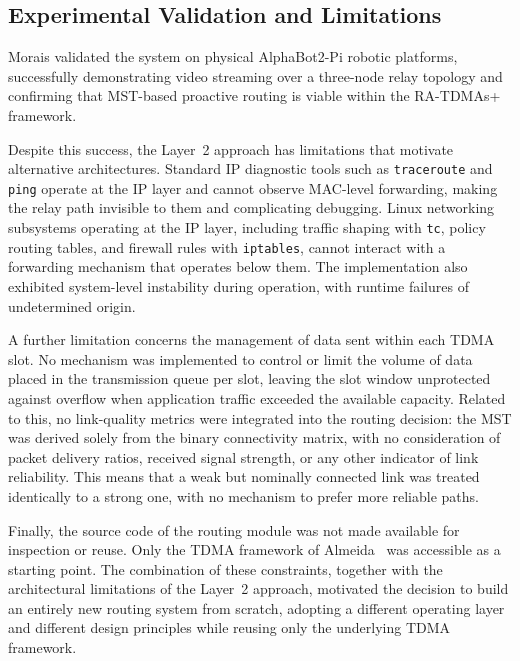 \FloatBarrier
\subsection{Experimental Validation and Limitations}

Morais validated the system on physical AlphaBot2-Pi robotic platforms, successfully
demonstrating video streaming over a three-node relay topology and confirming that MST-based
proactive routing is viable within the RA-TDMAs+ framework.

Despite this success, the Layer~2 approach has limitations that motivate alternative
architectures. Standard IP diagnostic tools such as \texttt{traceroute} and \texttt{ping} operate
at the IP layer and cannot observe MAC-level forwarding, making the relay path invisible to
them and complicating debugging. Linux networking subsystems operating at the IP layer,
including traffic shaping with \texttt{tc}, policy routing tables, and firewall rules with
\texttt{iptables}, cannot interact with a forwarding mechanism that operates below them.
The implementation also exhibited system-level instability during operation, with runtime
failures of undetermined origin.

A further limitation concerns the management of data sent within each TDMA slot. No
mechanism was implemented to control or limit the volume of data placed in the transmission
queue per slot, leaving the slot window unprotected against overflow when application traffic
exceeded the available capacity. Related to this, no link-quality metrics were integrated into
the routing decision: the MST was derived solely from the binary connectivity matrix, with no
consideration of packet delivery ratios, received signal strength, or any other indicator of
link reliability. This means that a weak but nominally connected link was treated identically to
a strong one, with no mechanism to prefer more reliable paths.

Finally, the source code of the routing module was not made available for inspection or reuse.
Only the TDMA framework of Almeida~\cite{almeida2023synchronization} was accessible as a
starting point. The combination of these constraints, together with the architectural limitations
of the Layer~2 approach, motivated the decision to build an entirely new routing system from
scratch, adopting a different operating layer and different design principles while reusing only
the underlying TDMA framework.


